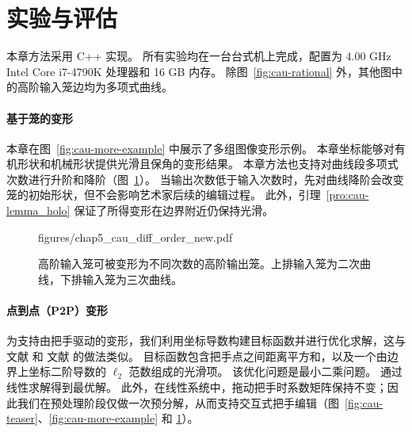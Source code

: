 \section{实验与评估}\label{sec:cau-results}
本章方法采用 C++ 实现。
所有实验均在一台台式机上完成，配置为 4.00 GHz Intel Core i7-4790K 处理器和 16 GB 内存。
%
除图~\ref{fig:cau-rational} 外，其他图中的高阶输入笼边均为多项式曲线。

\paragraph{基于笼的变形}
本章在图~\ref{fig:cau-more-example} 中展示了多组图像变形示例。
本章坐标能够对有机形状和机械形状提供光滑且保角的变形结果。
本章方法也支持对曲线段多项式次数进行升阶和降阶（图~\ref{fig:cau-diff-order}）。
当输出次数低于输入次数时，先对曲线降阶会改变笼的初始形状，但不会影响艺术家后续的编辑过程。
此外，引理~\ref{pro:cau-lemma_holo} 保证了所得变形在边界附近仍保持光滑。
\begin{figure}[t]
	\centering
	\begin{overpic}[width=0.99\linewidth]{figures/chap5_cau_diff_order_new.pdf}
		{
		}
	\end{overpic}
	\vspace{-2mm}
	\caption{
		高阶输入笼可被变形为不同次数的高阶输出笼。上排输入笼为二次曲线，下排输入笼为三次曲线。
	}
	\label{fig:cau-diff-order}
\end{figure}

\paragraph{点到点（P2P）变形}
为支持由把手驱动的变形，我们利用坐标导数构建目标函数并进行优化求解，这与文献 \cite{Weber2009} 和 文献\cite{Lin2024PolynomialCC} 的做法类似。
目标函数包含把手点之间距离平方和，以及一个由边界上坐标二阶导数的 $\ell_2$ 范数组成的光滑项。
%
该优化问题是最小二乘问题。
通过线性求解得到最优解。
此外，在线性系统中，拖动把手时系数矩阵保持不变；因此我们在预处理阶段仅做一次预分解，从而支持交互式把手编辑（图~\ref{fig:cau-teaser}、\ref{fig:cau-more-example} 和 \ref{fig:cau-diff-order}）。


